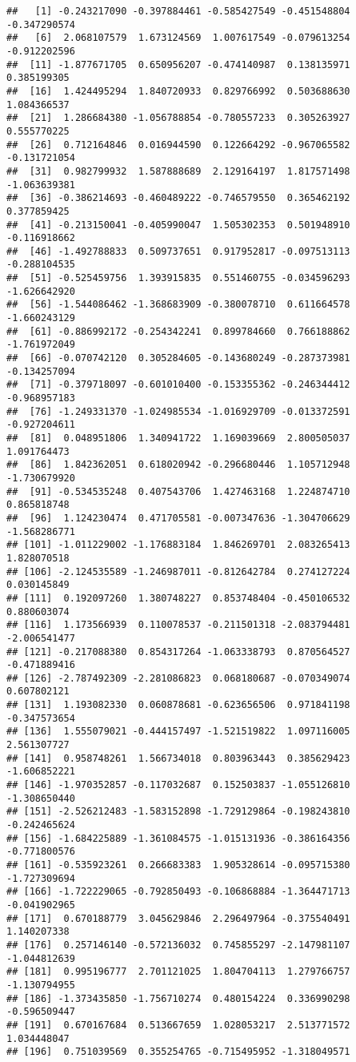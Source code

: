 \documentclass[
]{article}
\begin{document}
\begin{verbatim}
##   [1] -0.243217090 -0.397884461 -0.585427549 -0.451548804 -0.347290574
##   [6]  2.068107579  1.673124569  1.007617549 -0.079613254 -0.912202596
##  [11] -1.877671705  0.650956207 -0.474140987  0.138135971  0.385199305
##  [16]  1.424495294  1.840720933  0.829766992  0.503688630  1.084366537
##  [21]  1.286684380 -1.056788854 -0.780557233  0.305263927  0.555770225
##  [26]  0.712164846  0.016944590  0.122664292 -0.967065582 -0.131721054
##  [31]  0.982799932  1.587888689  2.129164197  1.817571498 -1.063639381
##  [36] -0.386214693 -0.460489222 -0.746579550  0.365462192  0.377859425
##  [41] -0.213150041 -0.405990047  1.505302353  0.501948910 -0.116918662
##  [46] -1.492788833  0.509737651  0.917952817 -0.097513113 -0.288104535
##  [51] -0.525459756  1.393915835  0.551460755 -0.034596293 -1.626642920
##  [56] -1.544086462 -1.368683909 -0.380078710  0.611664578 -1.660243129
##  [61] -0.886992172 -0.254342241  0.899784660  0.766188862 -1.761972049
##  [66] -0.070742120  0.305284605 -0.143680249 -0.287373981 -0.134257094
##  [71] -0.379718097 -0.601010400 -0.153355362 -0.246344412 -0.968957183
##  [76] -1.249331370 -1.024985534 -1.016929709 -0.013372591 -0.927204611
##  [81]  0.048951806  1.340941722  1.169039669  2.800505037  1.091764473
##  [86]  1.842362051  0.618020942 -0.296680446  1.105712948 -1.730679920
##  [91] -0.534535248  0.407543706  1.427463168  1.224874710  0.865818748
##  [96]  1.124230474  0.471705581 -0.007347636 -1.304706629 -1.568286771
## [101] -1.011229002 -1.176883184  1.846269701  2.083265413  1.828070518
## [106] -2.124535589 -1.246987011 -0.812642784  0.274127224  0.030145849
## [111]  0.192097260  1.380748227  0.853748404 -0.450106532  0.880603074
## [116]  1.173566939  0.110078537 -0.211501318 -2.083794481 -2.006541477
## [121] -0.217088380  0.854317264 -1.063338793  0.870564527 -0.471889416
## [126] -2.787492309 -2.281086823  0.068180687 -0.070349074  0.607802121
## [131]  1.193082330  0.060878681 -0.623656506  0.971841198 -0.347573654
## [136]  1.555079021 -0.444157497 -1.521519822  1.097116005  2.561307727
## [141]  0.958748261  1.566734018  0.803963443  0.385629423 -1.606852221
## [146] -1.970352857 -0.117032687  0.152503837 -1.055126810 -1.308650440
## [151] -2.526212483 -1.583152898 -1.729129864 -0.198243810 -0.242465624
## [156] -1.684225889 -1.361084575 -1.015131936 -0.386164356 -0.771800576
## [161] -0.535923261  0.266683383  1.905328614 -0.095715380 -1.727309694
## [166] -1.722229065 -0.792850493 -0.106868884 -1.364471713 -0.041902965
## [171]  0.670188779  3.045629846  2.296497964 -0.375540491  1.140207338
## [176]  0.257146140 -0.572136032  0.745855297 -2.147981107 -1.044812639
## [181]  0.995196777  2.701121025  1.804704113  1.279766757 -1.130794955
## [186] -1.373435850 -1.756710274  0.480154224  0.336990298 -0.596509447
## [191]  0.670167684  0.513667659  1.028053217  2.513771572  1.034448047
## [196]  0.751039569  0.355254765 -0.715495952 -1.318049571
\end{verbatim}
\end{document}
